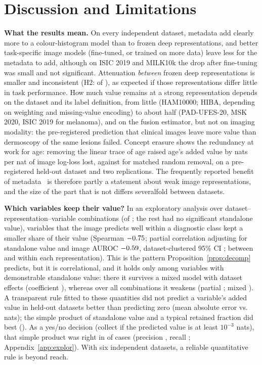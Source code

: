 \documentclass[conference]{IEEEtran}
\begin{document}
\section{Discussion and Limitations}
\textbf{What the results mean.} On every independent dataset, metadata add clearly more to a colour-histogram model than to frozen deep representations, and better task-specific image models (fine-tuned, or trained on more data) leave less for the metadata to add, although on ISIC 2019 and MILK10k the drop after fine-tuning was small and not significant. Attenuation \emph{between} frozen deep representations is smaller and inconsistent (H2: \REPindepHtwo{} of \REPindepN{}), as expected if those representations differ little in task performance. How much value remains at a strong representation depends on the dataset and its label definition, from little (HAM10000; HIBA, depending on weighting and missing-value encoding) to about half (PAD-UFES-20, MSK 2020, ISIC 2019 for melanoma), and on the fusion estimator, but not on imaging modality: the pre-registered prediction that clinical images leave more value than dermoscopy of the same lesions failed. Concept erasure shows the redundancy at work for age: removing the linear trace of age raised age's added value by \ERArfT{} nats per nat of image log-loss lost, against \ERArfR{} for matched random removal, on a pre-registered held-out dataset and two replications. The frequently reported benefit of metadata~\cite{hohn2021review,pacheco2020impact} is therefore partly a statement about weak image representations, and the size of the part that is not differs severalfold between datasets.

\textbf{Which variables keep their value?} In an exploratory analysis over \RECrows{} dataset--representation--variable combinations (of \RECrowsAll{}; the rest had no significant standalone value), variables that the image predicts well within a diagnostic class kept a smaller share of their value (Spearman $-0.75$; partial correlation adjusting for standalone value and image AUROC $-0.59$, dataset-clustered 95\% CI \RECpartialCI{}; between \RECrungMin{} and \RECrungMax{} within each representation). This is the pattern Proposition~\ref{prop:decomp} predicts, but it is correlational, and it holds only among variables with demonstrable standalone value: there it survives a mixed model with dataset effects (coefficient \RECfiltMixed{}), whereas over all \RECallRows{} combinations it weakens (partial \RECallPartial{}; mixed \RECallMixed{}). A transparent rule fitted to these quantities did not predict a variable's added value in held-out datasets better than predicting zero (mean absolute error \RULEridge{} vs.\ \RULEzero{} nats); the simple product of standalone value and a typical retained fraction did best (\RULEbase{}). As a yes/no decision (collect if the predicted value is at least $10^{-3}$ nats), that simple product was right in \RULEbaseAcc{} of cases (precision \RULEbasePrec{}, recall \RULEbaseRec{}; Appendix~\ref{app:explor}). With six independent datasets, a reliable quantitative rule is beyond reach.
\end{document}
